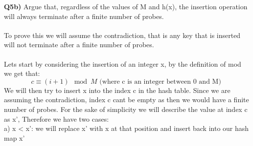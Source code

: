 \documentclass[12pt]{article}
\begin{document}
\begin{adjustwidth}{0em}{0pt}
\textbf{Q5b)} Argue that, regardless of the values of M and h(x), the insertion operation will always terminate after a finite number of probes. \\\\
To prove this we will assume the contradiction, that is any key that is inserted will not terminate after a finite number of probes.\\\\
Lets start by considering the insertion of an integer x, by the definition of mod we get that:
\[ c \equiv (i+1) \mod M \text{ (where c is an integer between 0 and M) } \]
We will then try to insert x into the index c in the hash table. Since we are assuming the contradiction, index c cant be empty as then we would have a finite number of probes. For the sake of simplicity we will describe the value at index c as x', Therefore we have two cases:\\

a) x < x': we will replace x' with x at that position and insert back into our hash map x'\\


\end{adjustwidth}
\end{document}
